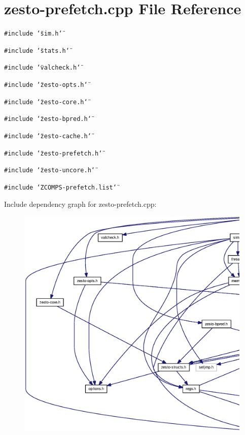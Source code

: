 \section{zesto-prefetch.cpp File Reference}
\label{zesto-prefetch_8cpp}
{\tt \#include \char`\"{}sim.h\char`\"{}}\par
{\tt \#include \char`\"{}stats.h\char`\"{}}\par
{\tt \#include \char`\"{}valcheck.h\char`\"{}}\par
{\tt \#include \char`\"{}zesto-opts.h\char`\"{}}\par
{\tt \#include \char`\"{}zesto-core.h\char`\"{}}\par
{\tt \#include \char`\"{}zesto-bpred.h\char`\"{}}\par
{\tt \#include \char`\"{}zesto-cache.h\char`\"{}}\par
{\tt \#include \char`\"{}zesto-prefetch.h\char`\"{}}\par
{\tt \#include \char`\"{}zesto-uncore.h\char`\"{}}\par
{\tt \#include \char`\"{}ZCOMPS-prefetch.list\char`\"{}}\par


Include dependency graph for zesto-prefetch.cpp:\nopagebreak
\begin{figure}[H]
\begin{center}
\leavevmode
\includegraphics[width=420pt]{zesto-prefetch_8cpp__incl}
\end{center}
\end{figure}
